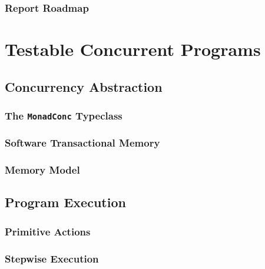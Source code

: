 \documentclass[openright, dottedtoc, headinclude, footinclude=true, a4paper, numbers=noenddot]{scrreprt}
\begin{document}
  \section{Report Roadmap}
  \label{sec:intro-roadmap}
  

\part{Testable Concurrent Programs}
\label{part:testable}

\null\clearpage
\chapter{Concurrency Abstraction}
\label{chap:abstraction}


  \section{The \texttt{MonadConc} Typeclass}
  \label{sec:abstraction-typeclass}
  

  \section{Software Transactional Memory}
  \label{sec:abstraction-stm}
  

  \section{Memory Model}
  \label{sec:abstraction-mem}
  

\null\clearpage
\chapter{Program Execution}
\label{chap:execution}


  \section{Primitive Actions}
  \label{sec:execution-primops}
  

  \section{Stepwise Execution}
  \label{sec:execution-stepwise}
  
\end{document}
